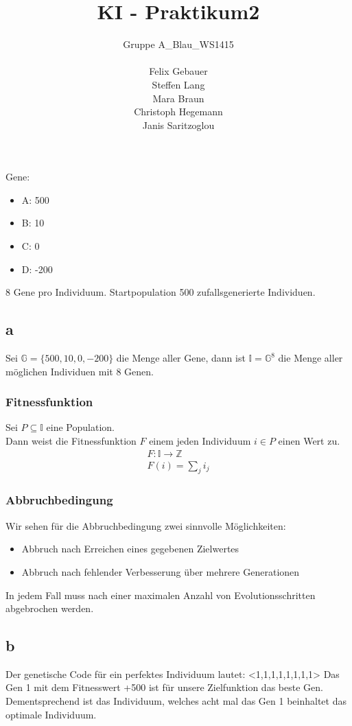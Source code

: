 \documentclass[12pt, a4paper]{article}
\title{KI - Praktikum2}
\author{Gruppe A\_Blau\_WS1415\\\\
    Felix Gebauer\\
    Steffen Lang\\
    Mara Braun\\
    Christoph Hegemann\\
    Janis Saritzoglou}
\begin{document}
\maketitle
\newpage
\section{}
Gene:
\begin{itemize}
\item A: 500
\item B: 10
\item C: 0
\item D: -200
\end{itemize}
8 Gene pro Individuum. Startpopulation 500 zufallsgenerierte
Individuen.

\subsection*{a}
Sei $\mathbb{G} = \{500,10,0,-200\}$ die Menge aller Gene, dann ist
$\mathbb{I} = \mathbb{G}^8$ die Menge aller möglichen Individuen mit 8
Genen.

\subsubsection*{Fitnessfunktion}
Sei $P \subseteq \mathbb{I}$ eine Population.\\
Dann weist die Fitnessfunktion $F$ einem jeden Individuum $i \in P$
einen Wert zu.\\
\begin{align*}
F: \mathbb{I} \longrightarrow \mathbb{Z}\\
F(i) = \sum_j i_j
\end{align*}

\subsubsection*{Abbruchbedingung}
Wir sehen für die Abbruchbedingung zwei sinnvolle Möglichkeiten:
\begin{itemize}
\item Abbruch nach Erreichen eines gegebenen Zielwertes
\item Abbruch nach fehlender Verbesserung über mehrere Generationen
\end{itemize}
In jedem Fall muss nach einer maximalen Anzahl von Evolutionsschritten
abgebrochen werden.

\subsection*{b}
Der genetische Code für ein perfektes Individuum lautet: <1,1,1,1,1,1,1,1>
Das Gen 1 mit dem Fitnesswert +500 ist für unsere Zielfunktion das beste Gen. Dementsprechend ist das Individuum, welches acht mal das Gen 1 beinhaltet das optimale Individuum. 
\end{document}
